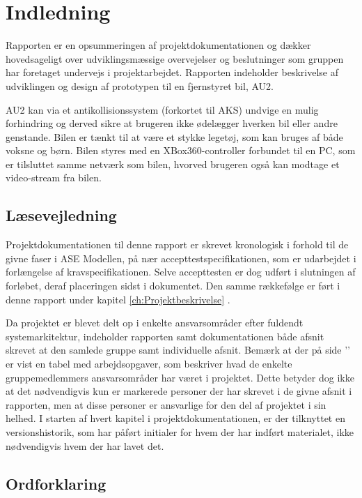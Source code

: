 \chapter{Indledning}
\label{ch:Indledning}
Rapporten er en opsummeringen af projektdokumentationen og dækker hovedsageligt over udviklingsmæssige overvejelser og beslutninger som gruppen har foretaget undervejs i projektarbejdet. 
Rapporten indeholder beskrivelse af udviklingen og design af prototypen til en fjernstyret bil, AU2.

AU2 kan via et antikollisionssystem (forkortet til AKS) undvige en mulig forhindring og derved sikre at brugeren ikke ødelægger hverken bil eller andre genstande. 
Bilen er tænkt til at være et stykke legetøj, som kan bruges af både voksne og børn. 
Bilen styres med en XBox360-controller forbundet til en PC, som er tilsluttet samme netværk som bilen, hvorved brugeren også kan modtage et video-stream fra bilen.


\section{Læsevejledning}
Projektdokumentationen til denne rapport er skrevet kronologisk i forhold til de givne faser i ASE Modellen\cite{lib:vejledning}, på nær accepttestspecifikationen, som er udarbejdet i forlængelse af kravspecifikationen. 
Selve accepttesten er dog udført i slutningen af forløbet, deraf placeringen sidst i dokumentet.
Den samme rækkefølge er ført i denne rapport under kapitel \ref{ch:Projektbeskrivelse} .

Da projektet er blevet delt op i enkelte ansvarsområder efter fuldendt systemarkitektur, indeholder rapporten samt dokumentationen både afsnit skrevet at den samlede gruppe samt individuelle afsnit.
Bemærk at der på side '\pageref{ch:arbejdsopgaver}' er vist en tabel med arbejdsopgaver, som beskriver hvad de enkelte gruppemedlemmers ansvarsområder har været i projektet. 
Dette betyder dog ikke at det nødvendigvis kun er markerede personer der har skrevet i de givne afsnit i rapporten, men at disse personer er ansvarlige for den del af projektet i sin helhed.
I starten af hvert kapitel i projektdokumentationen, er der tilknyttet en versionshistorik, som har påført initialer for hvem der har indført materialet, ikke nødvendigvis hvem der har lavet det.

\clearpage

\section{Ordforklaring}

